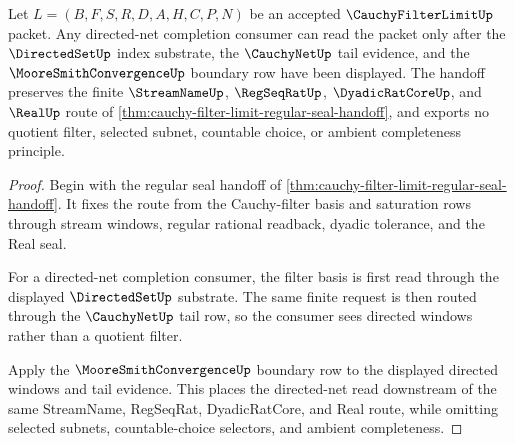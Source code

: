 \begin{theorem}
\label{thm:cauchy-filter-limit-directed-net-handoff}
Let $L=(B,F,S,R,D,A,H,C,P,N)$ be an accepted $\CauchyFilterLimitUp$ packet. Any directed-net completion consumer can read the packet only after the $\DirectedSetUp$ index substrate, the $\CauchyNetUp$ tail evidence, and the $\MooreSmithConvergenceUp$ boundary row have been displayed. The handoff preserves the finite $\StreamNameUp$, $\RegSeqRatUp$, $\DyadicRatCoreUp$, and $\RealUp$ route of \autoref{thm:cauchy-filter-limit-regular-seal-handoff}, and exports no quotient filter, selected subnet, countable choice, or ambient completeness principle.
\end{theorem}
\begin{proof}
Begin with the regular seal handoff of \autoref{thm:cauchy-filter-limit-regular-seal-handoff}. It fixes the route from the Cauchy-filter basis and saturation rows through stream windows, regular rational readback, dyadic tolerance, and the Real seal.

For a directed-net completion consumer, the filter basis is first read through the displayed $\DirectedSetUp$ substrate. The same finite request is then routed through the $\CauchyNetUp$ tail row, so the consumer sees directed windows rather than a quotient filter.

Apply the $\MooreSmithConvergenceUp$ boundary row to the displayed directed windows and tail evidence. This places the directed-net read downstream of the same StreamName, RegSeqRat, DyadicRatCore, and Real route, while omitting selected subnets, countable-choice selectors, and ambient completeness.
\end{proof}

